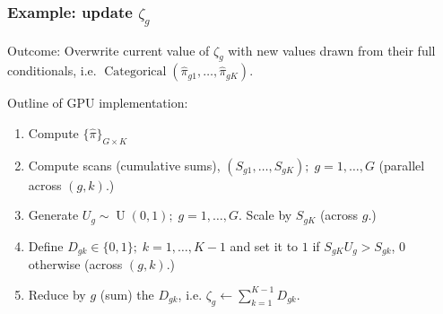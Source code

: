 \documentclass{beamer}
\newcommand{\op}{\operatorname}
\begin{document}
\begin{frame}%
  \frametitle{Example: update $\zeta_g$}
  Outcome: Overwrite current value of $\zeta_g$ with new values drawn from their full conditionals, i.e. $\op{Categorical}(\hat{\pi}_{g1},\ldots,\hat{\pi}_{gK})$.
  
  \vspace{.7cm}
  Outline of GPU implementation:
  \small
  \begin{enumerate}
    \pause\item Compute $\{\hat{\pi}\}_{G\times K}$
    \pause\item Compute scans (cumulative sums), $(S_{g1},\ldots,S_{gK});\;g=1,\ldots,G$ (parallel across $(g,k)$.)
    \pause\item Generate $U_g \sim \op{U}(0,1);\;g=1,\ldots,G$. Scale by $S_{gK}$ (across $g$.)
    \pause\item Define $D_{gk} \in \{0,1\};\;k=1,\ldots,K-1$ and set it to $1$ if $S_{gK}U_g > S_{gk}$, $0$ otherwise (across $(g,k)$.)
    \pause\item Reduce by $g$ (sum) the $D_{gk}$, i.e. $\zeta_g \leftarrow \sum_{k=1}^{K-1} D_{gk}$.
  \end{enumerate}
\end{frame}
\end{document}
